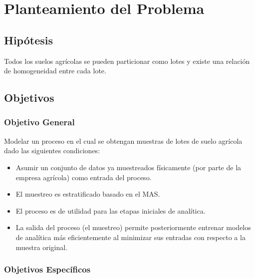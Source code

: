 \documentclass{report}
\begin{document}
\bigbreak

\chapter{Planteamiento del Problema}

\section{Hipótesis}

Todos los suelos agrícolas se pueden particionar como lotes y existe una relación de homogeneidad entre cada lote.

\section{Objetivos}

\subsection{Objetivo General}

Modelar un proceso en el cual se obtengan muestras de lotes de suelo agrícola dado las siguientes condiciones:

\begin{itemize}
    \item Asumir un conjunto de datos ya muestreados físicamente (por parte de la empresa agrícola) como entrada del proceso.
    
    \item El muestreo es estratificado basado en el MAS.
    
    \item El proceso es de utilidad para las etapas iniciales de analítica.
    
    \item La salida del proceso (el muestreo) permite posteriormente entrenar modelos de analítica más eficientemente al minimizar sus entradas con respecto a la muestra original.
\end{itemize}

\subsection{Objetivos Específicos}
\end{document}
